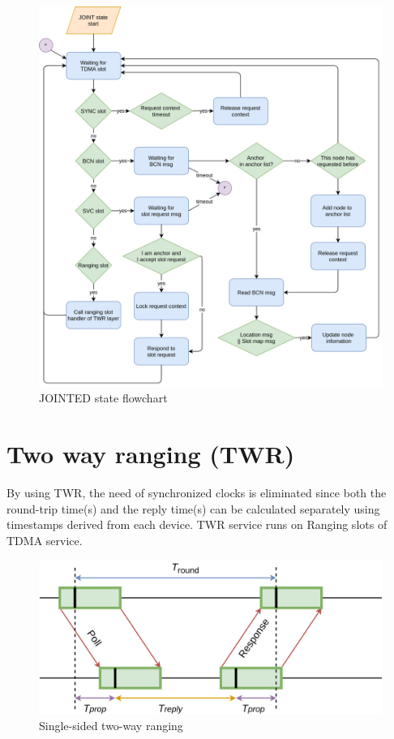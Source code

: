 \documentclass[\main/main.tex]{subfiles}
\begin{document}
\begin{figure}[H]
    \begin{center}
        \includegraphics[scale=0.32]{JOINTED_state_flow_chart.png}
    \end{center}
    \caption{JOINTED state flowchart}
    \label{fig:JOINTED_state_flowchart}
\end{figure}

\section{Two way ranging (TWR)}
By using TWR, the need of synchronized clocks is eliminated since both the round-trip time(s) and the reply time(s) can be calculated separately using timestamps derived from each device. TWR service runs on Ranging slots of TDMA service.

\begin{figure}[H]
    \begin{center}
        \includegraphics[scale=0.2]{single_sided_two_way_ranging.png}
    \end{center}
    \caption{Single-sided two-way ranging}
    \label{fig:single_sided_two_way_ranging}
\end{figure}
\end{document}
